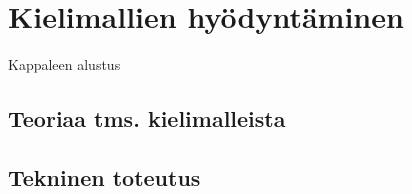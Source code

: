 \chapter{Kielimallien hyödyntäminen}%
\label{ch:kielimallit}

Kappaleen alustus

\section{Teoriaa tms. kielimalleista}

\section{Tekninen toteutus}
